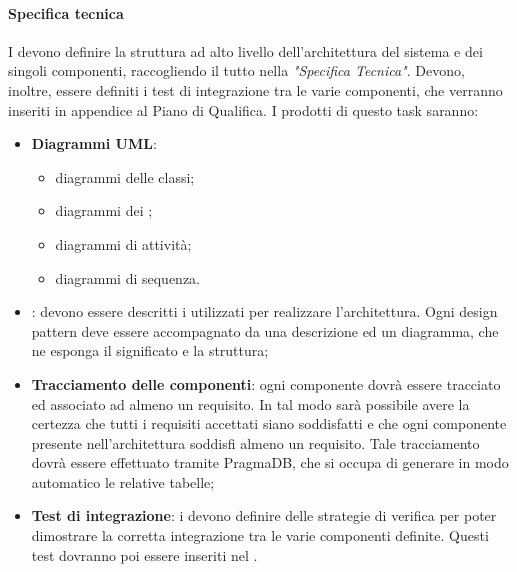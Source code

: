  \paragraph{Specifica tecnica}\label{Specifica tecnica}
 I \PJP{} devono definire la struttura ad alto livello dell'architettura del sistema e dei singoli
componenti, raccogliendo il tutto nella \textit{"Specifica Tecnica"}. Devono, inoltre, essere definiti i test di
integrazione tra le varie componenti, che verranno inseriti in appendice al Piano di Qualifica.
I prodotti di questo task saranno:
 \begin{itemize}
 	\item \textbf{Diagrammi UML}:
 	\begin{itemize}
 		\item diagrammi delle classi;
 		\item diagrammi dei ;
 		\item diagrammi di attività;
 		\item diagrammi di sequenza.
 	\end{itemize}
 	\item \textbf{}: devono essere descritti i  utilizzati per realizzare l'architettura. Ogni design
 	pattern deve essere accompagnato da una descrizione ed un diagramma, che ne esponga il
 	significato e la struttura;
 	\item \textbf{Tracciamento delle componenti}: ogni componente dovrà essere tracciato ed associato
 	ad almeno un requisito. In tal modo sarà possibile avere la certezza che tutti i requisiti
 	accettati siano soddisfatti e che ogni componente presente nell’architettura soddisfi almeno
 	un requisito. Tale tracciamento dovrà essere effettuato tramite PragmaDB, che si occupa
 	di generare in modo automatico le relative tabelle;
 	\item \textbf{Test di integrazione}: i \PJP{} devono definire delle strategie di verifica per poter dimostrare la corretta integrazione tra le varie componenti definite. Questi test dovranno poi essere inseriti nel .
 \end{itemize}
